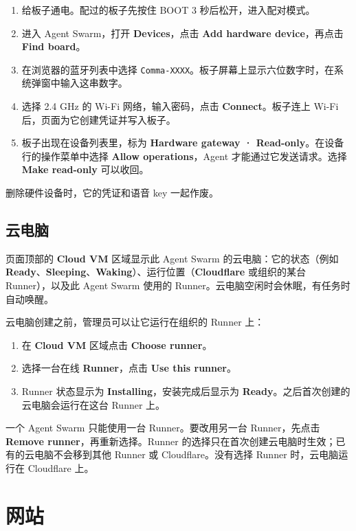 \documentclass[UTF8,a4paper,11pt]{ctexart}
\begin{document}
\begin{enumerate}
  \item 给板子通电。配过的板子先按住 BOOT 3 秒后松开，进入配对模式。
  \item 进入 Agent Swarm，打开 \textbf{Devices}，点击 \textbf{Add hardware device}，再点击 \textbf{Find board}。
  \item 在浏览器的蓝牙列表中选择 \texttt{Comma-XXXX}。板子屏幕上显示六位数字时，在系统弹窗中输入这串数字。
  \item 选择 2.4 GHz 的 Wi-Fi 网络，输入密码，点击 \textbf{Connect}。板子连上 Wi-Fi 后，页面为它创建凭证并写入板子。
  \item 板子出现在设备列表里，标为 \textbf{Hardware gateway · Read-only}。在设备行的操作菜单中选择 \textbf{Allow operations}，Agent 才能通过它发送请求。选择 \textbf{Make read-only} 可以收回。
\end{enumerate}

删除硬件设备时，它的凭证和语音 key 一起作废。

\subsection{云电脑}

页面顶部的 \textbf{Cloud VM} 区域显示此 Agent Swarm 的云电脑：它的状态（例如 \textbf{Ready}、\textbf{Sleeping}、\textbf{Waking}）、运行位置（\textbf{Cloudflare} 或组织的某台 Runner），以及此 Agent Swarm 使用的 Runner。云电脑空闲时会休眠，有任务时自动唤醒。

云电脑创建之前，管理员可以让它运行在组织的 Runner 上：

\begin{enumerate}
  \item 在 \textbf{Cloud VM} 区域点击 \textbf{Choose runner}。
  \item 选择一台在线 \textbf{Runner}，点击 \textbf{Use this runner}。
  \item Runner 状态显示为 \textbf{Installing}，安装完成后显示为 \textbf{Ready}。之后首次创建的云电脑会运行在这台 Runner 上。
\end{enumerate}

一个 Agent Swarm 只能使用一台 Runner。要改用另一台 Runner，先点击 \textbf{Remove runner}，再重新选择。Runner 的选择只在首次创建云电脑时生效；已有的云电脑不会移到其他 Runner 或 Cloudflare。没有选择 Runner 时，云电脑运行在 Cloudflare 上。

\section{网站}
\end{document}
